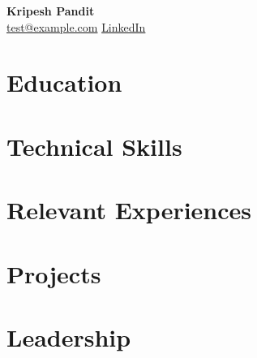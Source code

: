 \documentclass[12pt]{article} %
\begin{document}
\begin{center}
  \textbf{{\LARGE Kripesh Pandit}} \\[6pt]
   \hspace{3pt} \href{mailto:test@example.com}{test@example.com} \quad  \quad
  \faLinkedin \hspace{3pt} \href{https://www.linkedin.com/in/kripesh-pandit}{LinkedIn} \quad  \quad 
  \hspace{3pt}{1234567890} \hspace{3pt}
\end{center}
\vspace{-12pt}


\section{Education}
\begin{itemize}
\end{itemize}
\section{Technical Skills}
\section{Relevant Experiences}
\section{Projects}
\section{Leadership}
\end{document}
